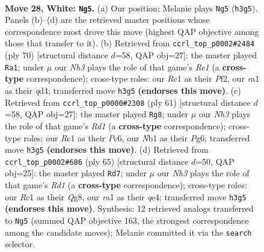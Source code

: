 \documentclass[11pt]{article}
\begin{document}
\clearpage

\begin{figure}[p]\centering
\begin{subfigure}{0.46\textwidth}\centering
\resizebox{\linewidth}{!}{%
\newchessgame
\chessboard[
  setfen={1Q4n1/5pk1/6p1/3q3p/3p3P/3P2PN/5P2/rNR3K1 w - - 3 28},
  showmover=false,
  pgfstyle=straightmove, color=movearrow, markmove={h3-g5}
]}
\caption{}
\end{subfigure}\hfill
\begin{subfigure}{0.46\textwidth}\centering
\resizebox{\linewidth}{!}{%
\newchessgame
\chessboard[
  setfen={6k1/r4pp1/P6p/6n1/3q4/2p1N2P/Q4PP1/4R1K1 w - - 0 36},
  showmover=false,
  pgfstyle=straightmove, color=movearrow, markmove={e1-a1}
]}
\caption{}
\end{subfigure}
\\[4pt]
\begin{subfigure}{0.46\textwidth}\centering
\resizebox{\linewidth}{!}{%
\newchessgame
\chessboard[
  setfen={2kr4/5q2/p1ppn1pR/4p3/4P1Q1/1P4N1/P1P2P2/1K6 b - - 3 31},
  showmover=false,
  pgfstyle=straightmove, color=movearrow, markmove={d8-g8}
]}
\caption{}
\end{subfigure}\hfill
\begin{subfigure}{0.46\textwidth}\centering
\resizebox{\linewidth}{!}{%
\newchessgame
\chessboard[
  setfen={3rk1q1/p1p5/1p1pn3/8/2P1Q3/2P4R/P4PP1/5K2 b - - 8 33},
  showmover=false,
  pgfstyle=straightmove, color=movearrow, markmove={d8-d7}
]}
\caption{}
\end{subfigure}
\caption{\textbf{Move 28, White: \texttt{Ng5}.} (a) Our position; Melanie plays \texttt{Ng5} (\texttt{h3g5}). Panels (b)--(d) are the retrieved master positions whose correspondence most drove this move (highest QAP objective among those that transfer to it). (b) Retrieved from \texttt{ccrl\_top\_p0002\#2484} (ply 70) [structural distance $d$=58, QAP obj=27]: the master played \texttt{Ra1}; under $\mu$ our \emph{Nh3} plays the role of that game's \emph{Re1} (a \textbf{cross-type} correspondence); cross-type roles: our \emph{R}c1 as their \emph{P}f2, our \emph{r}a1 as their \emph{q}d4; transferred move \texttt{h3g5} \textbf{(endorses this move)}. (c) Retrieved from \texttt{ccrl\_top\_p0000\#2308} (ply 61) [structural distance $d$=58, QAP obj=27]: the master played \texttt{Rg8}; under $\mu$ our \emph{Nh3} plays the role of that game's \emph{Rd1} (a \textbf{cross-type} correspondence); cross-type roles: our \emph{R}c1 as their \emph{P}c6, our \emph{N}b1 as their \emph{P}g6; transferred move \texttt{h3g5} \textbf{(endorses this move)}. (d) Retrieved from \texttt{ccrl\_top\_p0002\#686} (ply 65) [structural distance $d$=50, QAP obj=25]: the master played \texttt{Rd7}; under $\mu$ our \emph{Nh3} plays the role of that game's \emph{Rd1} (a \textbf{cross-type} correspondence); cross-type roles: our \emph{R}c1 as their \emph{Q}g8, our \emph{r}a1 as their \emph{q}e4; transferred move \texttt{h3g5} \textbf{(endorses this move)}. Synthesis: 12 retrieved analogs transferred to \texttt{Ng5} (summed QAP objective 163, the strongest correspondence among the candidate moves); Melanie committed it via the \texttt{search} selector.}
\label{fig:thought-m54}
\end{figure}
\end{document}
